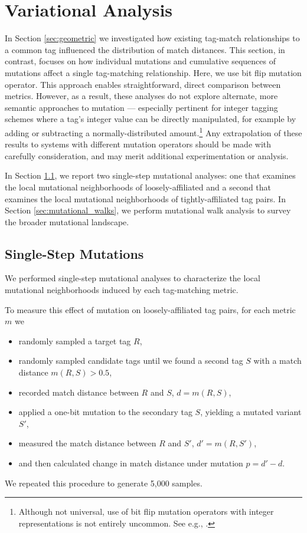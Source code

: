 \section{Variational Analysis} \label{sec:variational}

In Section \ref{sec:geometric} we investigated how existing tag-match relationships to a common tag influenced the distribution of match distances.
This section, in contrast, focuses on how individual mutations and cumulative sequences of mutations affect a single tag-matching relationship.
Here, we use bit flip mutation operator.
This approach enables straightforward, direct comparison between metrics.
However, as a result, these analyses do not explore alternate, more semantic approaches to mutation --- especially pertinent for integer tagging schemes where a tag's integer value can be directly manipulated, for example by adding or subtracting a normally-distributed amount.\footnote{
Although not universal, use of bit flip mutation operators with integer representations is not entirely uncommon.
See e.g., \cite{downing2015intelligence}.
}
Any extrapolation of these results to systems with different mutation operators should be made with carefully consideration, and may merit additional experimentation or analysis.

In Section \ref{sec:single_step}, we report two single-step mutational analyses: one that examines the local mutational neighborhoods of loosely-affiliated and a second that examines the local mutational neighborhoods of tightly-affiliated tag pairs.
In Section \ref{sec:mutational_walks}, we perform mutational walk analysis to survey the broader mutational landscape.

\subsection{Single-Step Mutations} \label{sec:single_step}



We performed single-step mutational analyses to characterize the local mutational neighborhoods induced by each tag-matching metric.

To measure this effect of mutation on loosely-affiliated tag pairs, for each metric $m$ we
\begin{itemize}
    \item randomly sampled a target tag $R$,
    \item randomly sampled candidate tags until we found a second tag $S$ with a match distance $m(R, S) > 0.5$,
    \item recorded match distance between $R$ and $S$, $d = m(R, S)$,
    \item applied a one-bit mutation to the secondary tag $S$, yielding a mutated variant $S'$,
    \item measured the match distance between $R$ and $S'$, $d' = m(R, S')$,
    \item and then calculated change in match distance under mutation $p = d' - d$.
\end{itemize}
We repeated this procedure to generate 5,000 samples.

